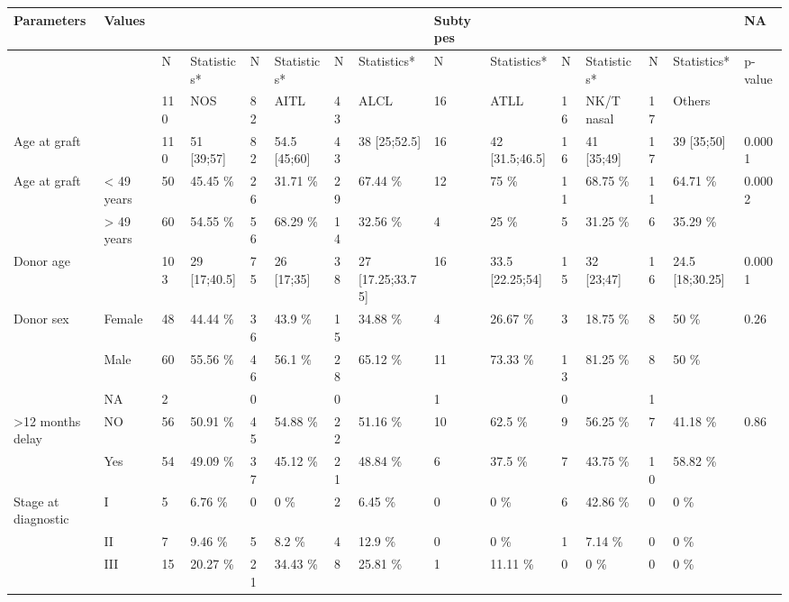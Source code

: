 \documentclass[a4paper,11pt] {article}
\begin{document}
\pagebreak[4]
\begin{landscape}




\begin{longtable}{lllllllllllllll}
  \hline
Parameters & Values &  &  &  &  &  &  & Subtypes &  &  &  &  &  & NA \\ 
  \hline
 &  & N & Statistics* & N & Statistics* & N & Statistics* & N & Statistics* & N & Statistics* & N & Statistics* & p-value \\ 
   &  & 110 & NOS & 82 & AITL & 43 & ALCL & 16 & ATLL & 16 & NK/T nasal & 17 & Others &  \\ 
  Age at graft &  & 110 & 51 [39;57] & 82 & 54.5 [45;60] & 43 & 38 [25;52.5] & 16 & 42 [31.5;46.5] & 16 & 41 [35;49] & 17 & 39 [35;50] & 0.0001 \\ 
  Age at graft & < 49 years & 50 & 45.45 \% & 26 & 31.71 \% & 29 & 67.44 \% & 12 & 75 \% & 11 & 68.75 \% & 11 & 64.71 \% & 0.0002 \\ 
   & > 49 years & 60 & 54.55 \% & 56 & 68.29 \% & 14 & 32.56 \% & 4 & 25 \% & 5 & 31.25 \% & 6 & 35.29 \% &  \\ 
  Donor age &  & 103 & 29 [17;40.5] & 75 & 26 [17;35] & 38 & 27 [17.25;33.75] & 16 & 33.5 [22.25;54] & 15 & 32 [23;47] & 16 & 24.5 [18;30.25] & 0.0001 \\ 
  Donor sex & Female & 48 & 44.44 \% & 36 & 43.9 \% & 15 & 34.88 \% & 4 & 26.67 \% & 3 & 18.75 \% & 8 & 50 \% & 0.26 \\ 
   & Male & 60 & 55.56 \% & 46 & 56.1 \% & 28 & 65.12 \% & 11 & 73.33 \% & 13 & 81.25 \% & 8 & 50 \% &  \\ 
   & NA & 2 &  & 0 &  & 0 &  & 1 &  & 0 &  & 1 &  &  \\ 
  >12 months delay & NO & 56 & 50.91 \% & 45 & 54.88 \% & 22 & 51.16 \% & 10 & 62.5 \% & 9 & 56.25 \% & 7 & 41.18 \% & 0.86 \\ 
   & Yes & 54 & 49.09 \% & 37 & 45.12 \% & 21 & 48.84 \% & 6 & 37.5 \% & 7 & 43.75 \% & 10 & 58.82 \% &  \\ 
  Stage at diagnostic & I & 5 & 6.76 \% & 0 & 0 \% & 2 & 6.45 \% & 0 & 0 \% & 6 & 42.86 \% & 0 & 0 \% &  \\ 
   & II & 7 & 9.46 \% & 5 & 8.2 \% & 4 & 12.9 \% & 0 & 0 \% & 1 & 7.14 \% & 0 & 0 \% &  \\ 
   & III & 15 & 20.27 \% & 21 & 34.43 \% & 8 & 25.81 \% & 1 & 11.11 \% & 0 & 0 \% & 0 & 0 \% &  \\ 

\end{longtable}
\end{landscape}
\end{document}

